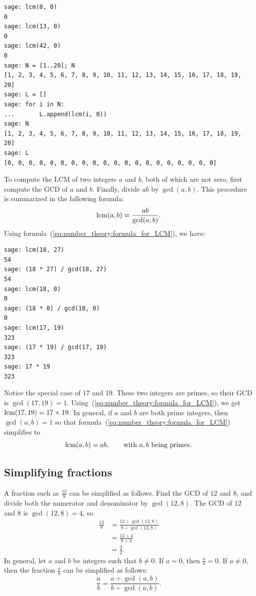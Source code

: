 \begin{lstlisting}
sage: lcm(0, 0)
0
sage: lcm(13, 0)
0
sage: lcm(42, 0)
0
sage: N = [1..20]; N
[1, 2, 3, 4, 5, 6, 7, 8, 9, 10, 11, 12, 13, 14, 15, 16, 17, 18, 19, 20]
sage: L = []
sage: for i in N:
...       L.append(lcm(i, 0))
sage: N
[1, 2, 3, 4, 5, 6, 7, 8, 9, 10, 11, 12, 13, 14, 15, 16, 17, 18, 19, 20]
sage: L
[0, 0, 0, 0, 0, 0, 0, 0, 0, 0, 0, 0, 0, 0, 0, 0, 0, 0, 0, 0]
\end{lstlisting}

To compute the LCM of two integers $a$ and $b$, both of which are not
zero, first compute the GCD of $a$ and $b$. Finally, divide $ab$ by
$\gcd(a,b)$. This procedure is summarized in the following formula:
%
\begin{equation}
\label{eq:number_theory:formula_for_LCM}
\operatorname*{\text{lcm}}(a, b)
=
\frac{ab}{\gcd(a, b)}.
\end{equation}
%
Using formula~(\ref{eq:number_theory:formula_for_LCM}), we have:
%
\begin{lstlisting}
sage: lcm(18, 27)
54
sage: (18 * 27) / gcd(18, 27)
54
sage: lcm(18, 0)
0
sage: (18 * 0) / gcd(18, 0)
0
sage: lcm(17, 19)
323
sage: (17 * 19) / gcd(17, 19)
323
sage: 17 * 19
323
\end{lstlisting}

Notice the special case of $17$ and $19$. These two integers are
primes, so their GCD is $\gcd(17, 19) = 1$.
Using~(\ref{eq:number_theory:formula_for_LCM}), we get
$\operatorname*{\text{lcm}}(17, 19) = 17 \times 19$. In general, if $a$ and $b$ are both
prime integers, then $\gcd(a, b) = 1$ so that
formula~(\ref{eq:number_theory:formula_for_LCM}) simplifies to
\[
\operatorname*{\text{lcm}}(a, b)
=
ab,
\qquad
\text{with $a,b$ being primes}.
\]



\subsection{Simplifying fractions}

A fraction such as $\frac{12}{8}$ can be simplified as follows. Find
the GCD of $12$ and $8$, and divide both the numerator and denominator
by $\gcd(12, 8)$. The GCD of $12$ and $8$ is $\gcd(12, 8) = 4$, so
%
\begin{align*}
\frac{12}{8}
&=
\frac{12 \div \gcd(12, 8)} {8 \div \gcd(12, 8)} \\[4pt]
&=
\frac{12 \div 4} {8 \div 4} \\[4pt]
&=
\frac{3}{2}.
\end{align*}
%
In general, let $a$ and $b$ be integers such that $b \neq 0$. If
$a = 0$, then $\frac{a}{b} = 0$. If $a \neq 0$, then the fraction
$\frac{a}{b}$ can be simplified as follows:
\[
\frac{a}{b}
=
\frac{a \div \gcd(a, b)} {b \div \gcd(a, b)}.
\]

